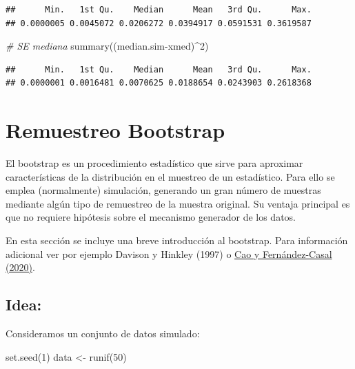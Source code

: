 \documentclass[
]{book}
\newenvironment{Shaded}{\begin{snugshade}}{\end{snugshade}}
\newcommand{\CommentTok}[1]{\textcolor[rgb]{0.56,0.35,0.01}{\textit{#1}}}
\newcommand{\DecValTok}[1]{\textcolor[rgb]{0.00,0.00,0.81}{#1}}
\newcommand{\FunctionTok}[1]{\textcolor[rgb]{0.00,0.00,0.00}{#1}}
\newcommand{\NormalTok}[1]{#1}
\newcommand{\OtherTok}[1]{\textcolor[rgb]{0.56,0.35,0.01}{#1}}
\newcommand{\SpecialCharTok}[1]{\textcolor[rgb]{0.00,0.00,0.00}{#1}}
\theoremstyle{break}
\theoremstyle{definition}
\theoremstyle{definition}
\theoremstyle{definition}
\theoremstyle{definition}
\theoremstyle{remark}
\begin{document}
\begin{enumerate}
\begin{verbatim}
##      Min.   1st Qu.    Median      Mean   3rd Qu.      Max. 
## 0.0000005 0.0045072 0.0206272 0.0394917 0.0591531 0.3619587
\end{verbatim}

\begin{Shaded}
\begin{Highlighting}[]
\CommentTok{\# SE mediana}
\FunctionTok{summary}\NormalTok{((median.sim}\SpecialCharTok{{-}}\NormalTok{xmed)}\SpecialCharTok{\^{}}\DecValTok{2}\NormalTok{) }
\end{Highlighting}
\end{Shaded}

\begin{verbatim}
##      Min.   1st Qu.    Median      Mean   3rd Qu.      Max. 
## 0.0000001 0.0016481 0.0070625 0.0188654 0.0243903 0.2618368
\end{verbatim}
\end{enumerate}

\hypertarget{bootstrap}{%
\section{Remuestreo Bootstrap}\label{bootstrap}}

El bootstrap es un procedimiento estadístico que sirve para aproximar características de la distribución en el muestreo de un estadístico.
Para ello se emplea (normalmente) simulación, generando un gran número de muestras mediante algún tipo de remuestreo de la muestra original.
Su ventaja principal es que no requiere hipótesis sobre el mecanismo generador de los datos.

En esta sección se incluye una breve introducción al bootstrap.
Para información adicional ver por ejemplo Davison y Hinkley (1997) o \href{https://rubenfcasal.github.io/book_remuestreo}{Cao y Fernández-Casal (2020)}.

\hypertarget{idea}{%
\subsection{Idea:}\label{idea}}

Consideramos un conjunto de datos simulado:

\begin{Shaded}
\begin{Highlighting}[]
\FunctionTok{set.seed}\NormalTok{(}\DecValTok{1}\NormalTok{)}
\NormalTok{data }\OtherTok{\textless{}{-}} \FunctionTok{runif}\NormalTok{(}\DecValTok{50}\NormalTok{)}
\end{Highlighting}
\end{Shaded}
\end{document}
